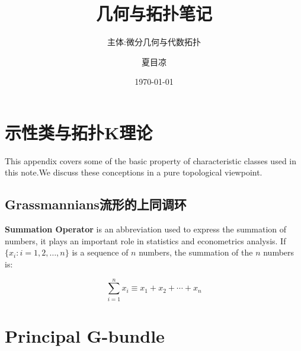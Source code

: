 \documentclass[lang=cn,newtx,10pt,scheme=chinese]{elegantbook}
\title{几何与拓扑笔记}
\subtitle{主体:微分几何与代数拓扑}
\author{夏目凉}
\institute{陈省身数学研究所 Chern Institute of Mathematica}
\date{\today}
\begin{document}
\maketitle

\frontmatter

\tableofcontents

\mainmatter









\nocite{en2,en3}

\printbibliography[heading=bibintoc, title=\ebibname]
\appendix


\chapter{示性类与拓扑K理论}

This appendix covers some of the basic property of characteristic classes used in this note.We discuss these conceptions in a pure topological viewpoint.

\section{Grassmannians流形的上同调环}

\textbf{Summation Operator} is an abbreviation used to express the summation of numbers, it plays an important role in statistics and econometrics analysis. If $\{x_i: i=1, 2, \ldots, n\}$ is a sequence of $n$ numbers, the summation of the $n$ numbers is:

\begin{equation}
\sum_{i=1}^n x_i \equiv x_1 + x_2 +\cdots + x_n
\end{equation}
\chapter{Principal G-bundle}
\end{document}
